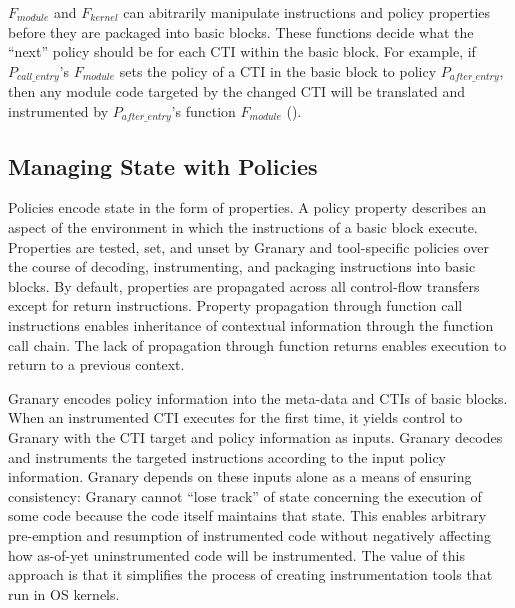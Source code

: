 \documentclass{sigplanconf}
\begin{document}


$F_{module}$ and $F_{kernel}$ can abitrarily manipulate instructions and policy properties before they are packaged into basic blocks. These functions decide what the ``next'' policy should be for each CTI within the basic block. For example, if $P_{call\_entry}$'s $F_{module}$ sets the policy of a CTI in the basic block to policy $P_{after\_entry}$, then any module code targeted by the changed CTI will be translated and instrumented by $P_{after\_entry}$'s function $F_{module}$ (). 


\subsection{Managing State with Policies}

Policies encode state in the form of properties. A policy property describes an aspect of the environment in which the instructions of a basic block execute. Properties are tested, set, and unset by Granary and tool-specific policies over the course of decoding, instrumenting, and packaging instructions into basic blocks. By default, properties are propagated across all control-flow transfers except for return instructions. Property propagation through function call instructions enables inheritance of contextual information through the function call chain. The lack of propagation through function returns enables execution to return to a previous context.

Granary encodes policy information into the meta-data and CTIs of basic blocks. When an instrumented CTI executes for the first time, it yields control to Granary with the CTI target and policy information as inputs. Granary decodes and instruments the targeted instructions according to the input policy information. Granary depends on these inputs alone as a means of ensuring consistency: Granary cannot ``lose track'' of state concerning the execution of some code because the code itself maintains that state.  This enables arbitrary pre-emption and resumption of instrumented code without negatively affecting how as-of-yet uninstrumented code will be instrumented. The value of this approach is that it simplifies the process of creating instrumentation tools that run in OS kernels.
\end{document}
